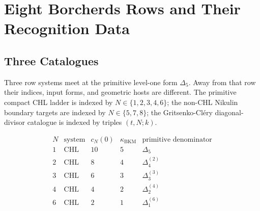 
\providecommand{\kBKM}{\kappa_{\mathrm{BKM}}}
\providecommand{\kch}{\kappa_{\mathrm{ch}}}
\providecommand{\kcat}{\kappa_{\mathrm{cat}}}
\providecommand{\kfib}{\kappa_{\mathrm{fiber}}}
\providecommand{\Z}{\mathbb{Z}}
\providecommand{\C}{\mathbb{C}}
\providecommand{\Sp}{\mathrm{Sp}}
\providecommand{\wt}{\mathrm{wt}}
\providecommand{\CoHA}{\mathrm{CoHA}}
\providecommand{\CY}{\mathrm{CY}}
\providecommand{\CHL}{\mathrm{CHL}}
\providecommand{\K}{K3}
\providecommand{\cO}{\mathcal{O}}
\providecommand{\Dfive}{D_5}
\providecommand{\Delfnm}[2]{\Delta_{#1}^{(#2)}}
\providecommand{\Yplus}{Y^{+}}
\providecommand{\Winf}{\mathcal{W}_{1+\infty}}
\providecommand{\gDelta}{\mathfrak{g}_{\Delta_5}}
\providecommand{\gBPS}{\mathfrak{g}_{\mathrm{BPS}}}
\providecommand{\Hall}{\mathrm{Hall}}

\section*{Eight Borcherds Rows and Their Recognition Data}
\label{note:eight-borcherds-rows-recognition-data}

\subsection*{Three Catalogues}

Three row systems meet at the primitive level-one form $\Delta_5$.
Away from that row their indices, input forms, and geometric hosts are
different.  The primitive compact CHL ladder is indexed by
$N\in\{1,2,3,4,6\}$; the non-CHL Nikulin boundary targets are indexed
by $N\in\{5,7,8\}$; the Gritsenko-Cl\'ery diagonal-divisor catalogue
is indexed by triples $(t,N;k)$.

\[
\begin{array}{c|c|c|c|l}
N & \text{system} & c_N(0) & \kBKM & \text{primitive denominator}\\\hline
1 & \CHL & 10 & 5 & \Delta_5\\
2 & \CHL & 8  & 4 & \Delfnm{4}{2}\\
3 & \CHL & 6  & 3 & \Delfnm{3}{3}\\
4 & \CHL & 4  & 2 & \Delfnm{2}{4}\\
6 & \CHL & 2  & 1 & \Delfnm{1}{6}
\end{array}
\]

